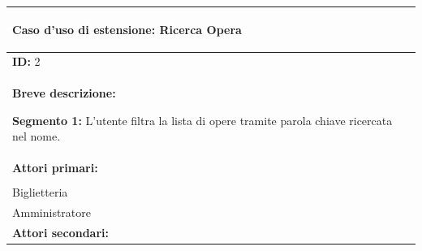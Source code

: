 \documentclass{article}
\begin{document}
                \begin{table}[t]
                    \centering
                    \begin{tabular}{|p{\linewidth}|}
                        \hline
                        \cellcolor{gray!100}
                        \begin{center}
                            \color{white}
                            \textbf{Caso d'uso di estensione:} Ricerca Opera
                        \end{center} \\
                        \hline
                        \textbf{ID:} 2 \\
                        \hline
                        \cellcolor{gray!20}
                        \textbf{Breve descrizione:} 
                            
                        \textbf{Segmento 1:} L'utente filtra la lista di opere tramite parola chiave ricercata nel nome.\\
                        \hline
                        \textbf{Attori primari:} \\
                        \begin{minipage}{\linewidth}
                            Cliente \\
                            Biglietteria \\
                            Amministratore
                        \end{minipage}
                        \vspace{1pt} \\
                        \hline
                        \textbf{Attori secondari:}


\end{tabular}
\end{table}
\end{document}
